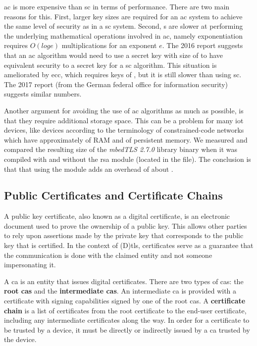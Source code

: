 \documentclass{llncs}
\begin{document}
\gls{ac} is more expensive than \gls{sc} in terms of performance. There are two main reasons for this. First, larger key sizes are required for an \gls{ac} system to achieve the
same level of security as in a \gls{sc} system. Second, s are slower at performing the underlying
mathematical operations involved in \gls{ac}, namely exponentiation requires
$O(log e)$ multiplications for an exponent $e$. The 2016  report \cite{Recommen44:online}
suggests that an \gls{ac} algorithm would need to use a secret key with size of 
to have equivalent security to a  secret key for a \gls{sc} algorithm.
This situation is ameliorated by \gls{ecc}, which requires keys of , but
it is still slower than using \gls{sc}. The 2017  report \cite{Kryptogr1:online} (from the
German federal office for information security) suggests similar numbers.

Another argument for avoiding the use of \gls{ac}
algorithms as much as possible, is that they require additional storage space. This can be a problem for many \gls{iot} devices,
like  devices according to the terminology of constrained-code
networks\cite{RFC7228} which have approximately  of RAM and 
of persistent memory. We measured and compared the resulting size of the \textit{mbedTLS 2.7.0} library\cite{SSLLibra13:online} binary when it was compiled with and without the \gls{rsa} module
(located in the  file). The conclusion is that that using the  module adds an overhead of about .

\subsection{Public Certificates and Certificate Chains} \label{pccc}

A public key certificate, also known as a digital certificate, is an electronic
document used to prove the ownership of a public key. This allows other parties
to rely upon assertions made by the private key that corresponds to the public key
that is certified. In the context of (D)\gls{tls}, certificates serve as a guarantee
that the communication is done with the claimed entity and not someone impersonating it.

A \gls{ca} is an entity that issues digital certificates. There are two types of
\gls{ca}s: the \textbf{root \gls{ca}s} and the \textbf{intermediate \gls{ca}s}.
An intermediate \gls{ca} is provided with a certificate with signing capabilities
signed by one of the root \gls{ca}s. A \textbf{certificate chain} is a list of
certificates from the root certificate to the end-user certificate, including
any intermediate certificates along the way. In order for a certificate
to be trusted by a device, it must be directly or indirectly issued by a \gls{ca} trusted by the device.
\end{document}
